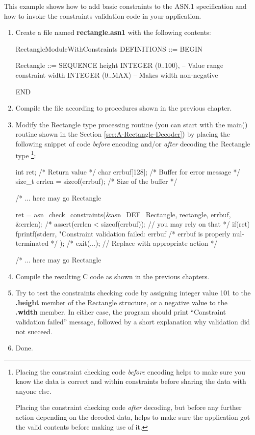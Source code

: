 \documentclass[english,oneside,12pt]{book}
\begin{document}
This example shows how to add basic constraints to the ASN.1 specification
and how to invoke the constraints validation code in your application.
\begin{enumerate}
\item Create a file named \textbf{rectangle.asn1} with the following contents:

\begin{asn}
RectangleModuleWithConstraints DEFINITIONS ::= BEGIN

Rectangle ::= SEQUENCE {
    height  INTEGER (0..100), -- Value range constraint
    width   INTEGER (0..MAX)  -- Makes width non-negative 
}

END
\end{asn}
\item Compile the file according to procedures shown in the previous chapter.
\item Modify the Rectangle type processing routine (you can start with the
main() routine shown in the Section \vref{sec:A-Rectangle-Decoder})
by placing the following snippet of code \emph{before} encoding and/or
\emph{after} decoding the Rectangle type%
\footnote{Placing the constraint checking code \emph{before} encoding helps
to make sure you know the data is correct and within constraints before
sharing the data with anyone else.

Placing the constraint checking code \emph{after} decoding, but before
any further action depending on the decoded data, helps to make sure
the application got the valid contents before making use of it.%
}:

\begin{codesample}
int ret;           /* Return value */
char errbuf[128];  /* Buffer for error message */
size_t errlen = sizeof(errbuf);  /* Size of the buffer */

/* ... here may go Rectangle %

ret = asn_check_constraints(&asn_DEF_Rectangle, rectangle, errbuf, &errlen);
/* assert(errlen < sizeof(errbuf)); // you may rely on that */
if(ret) {
    fprintf(stderr, "Constraint validation failed: %
            errbuf   /* errbuf is properly nul-terminated */
    );
    /* exit(...); // Replace with appropriate action */
 }

/* ... here may go Rectangle %
\end{codesample}
\item Compile the resulting C code as shown in the previous chapters.
\item Try to test the constraints checking code by assigning integer value
101 to the \textbf{.height} member of the Rectangle structure, or
a negative value to the \textbf{.width} member. In either case, the
program should print ``Constraint validation failed'' message, followed
by a short explanation why validation did not succeed.
\item Done.
\end{enumerate}
\end{document}
